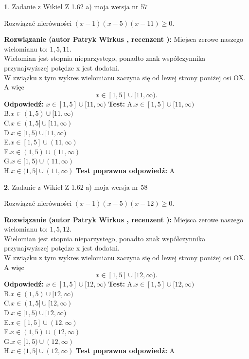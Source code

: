 \documentclass[12pt, a4paper]{article}
\theoremstyle{definition} %
\newtheorem{zad}{}
\newcommand{\zadStart}[1]{\begin{zad}#1\newline}
\newcommand{\zadStop}{\end{zad}}
\newcommand{\rozwStart}[2]{\noindent \textbf{Rozwiązanie (autor #1 , recenzent #2): }\newline}
\newcommand{\rozwStop}{\newline}
\newcommand{\odpStart}{\noindent \textbf{Odpowiedź:}\newline}
\newcommand{\odpStop}{\newline}
\newcommand{\testStart}{\noindent \textbf{Test:}\newline}
\newcommand{\testStop}{\newline}
\newcommand{\kluczStart}{\noindent \textbf{Test poprawna odpowiedź:}\newline}
\newcommand{\kluczStop}{\newline}
\begin{document}
\zadStart{Zadanie z Wikieł Z 1.62 a) moja wersja nr 57}

Rozwiązać nierówności $(x-1)(x-5)(x-11)\ge0$.
\zadStop
\rozwStart{Patryk Wirkus}{}
Miejsca zerowe naszego wielomianu to: $1, 5, 11$.\\
Wielomian jest stopnia nieparzystego, ponadto znak współczynnika przy\linebreak najwyższej potędze x jest dodatni.\\ W związku z tym wykres wielomianu zaczyna się od lewej strony poniżej osi OX. A więc $$x \in [1,5] \cup [11,\infty).$$
\rozwStop
\odpStart
$x \in [1,5] \cup [11,\infty)$
\odpStop
\testStart
A.$x \in [1,5] \cup [11,\infty)$\\
B.$x \in (1,5) \cup [11,\infty)$\\
C.$x \in (1,5] \cup [11,\infty)$\\
D.$x \in [1,5) \cup [11,\infty)$\\
E.$x \in [1,5] \cup (11,\infty)$\\
F.$x \in (1,5) \cup (11,\infty)$\\
G.$x \in [1,5) \cup (11,\infty)$\\
H.$x \in (1,5] \cup (11,\infty)$
\testStop
\kluczStart
A
\kluczStop



\zadStart{Zadanie z Wikieł Z 1.62 a) moja wersja nr 58}

Rozwiązać nierówności $(x-1)(x-5)(x-12)\ge0$.
\zadStop
\rozwStart{Patryk Wirkus}{}
Miejsca zerowe naszego wielomianu to: $1, 5, 12$.\\
Wielomian jest stopnia nieparzystego, ponadto znak współczynnika przy\linebreak najwyższej potędze x jest dodatni.\\ W związku z tym wykres wielomianu zaczyna się od lewej strony poniżej osi OX. A więc $$x \in [1,5] \cup [12,\infty).$$
\rozwStop
\odpStart
$x \in [1,5] \cup [12,\infty)$
\odpStop
\testStart
A.$x \in [1,5] \cup [12,\infty)$\\
B.$x \in (1,5) \cup [12,\infty)$\\
C.$x \in (1,5] \cup [12,\infty)$\\
D.$x \in [1,5) \cup [12,\infty)$\\
E.$x \in [1,5] \cup (12,\infty)$\\
F.$x \in (1,5) \cup (12,\infty)$\\
G.$x \in [1,5) \cup (12,\infty)$\\
H.$x \in (1,5] \cup (12,\infty)$
\testStop
\kluczStart
A
\kluczStop
\end{document}
